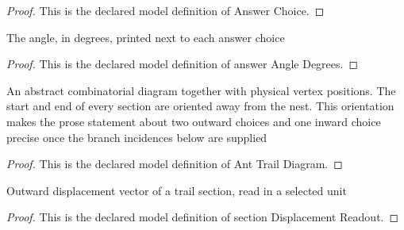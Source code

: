 \begin{proof}
  This is the declared model definition of Answer Choice.
\end{proof}
\begin{definition}
  \label{def:physics:phyx-mini-0734:phyxminiproblems-problemphyxmini0734-answerangledegrees}
  The angle, in degrees, printed next to each answer choice
\end{definition}
\begin{proof}
  This is the declared model definition of answer Angle Degrees.
\end{proof}
\begin{definition}
  \label{def:physics:phyx-mini-0734:phyxminiproblems-problemphyxmini0734-anttraildiagram}
  An abstract combinatorial diagram together with physical vertex positions. The start and end of every section are oriented away from the nest. This orientation makes the prose statement about two outward choices and one inward choice precise once the branch incidences below are supplied
\end{definition}
\begin{proof}
  This is the declared model definition of Ant Trail Diagram.
\end{proof}
\begin{definition}
  \label{def:physics:phyx-mini-0734:phyxminiproblems-problemphyxmini0734-sectiondisplacementreadout}
  Outward displacement vector of a trail section, read in a selected unit
\end{definition}
\begin{proof}
  This is the declared model definition of section Displacement Readout.
\end{proof}
